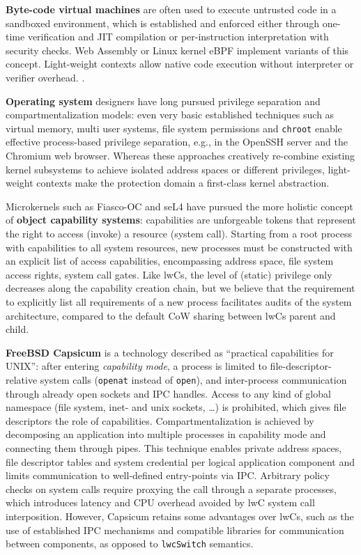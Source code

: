 \documentclass[10pt,twocolumn,a4paper]{article}
\begin{document}
\textbf{Byte-code virtual machines} are often used to execute untrusted code in a sandboxed environment,
which is established and enforced either through one-time verification and JIT compilation or per-instruction interpretation with security checks.
Web Assembly or Linux kernel eBPF implement variants of this concept.
Light-weight contexts allow native code execution without interpreter or verifier overhead.
\cite{haas2017bringingwebassembly, lwnebpf}.

\textbf{Operating system} designers have long pursued privilege separation and compartmentalization models:
even very basic established techniques such as virtual memory, multi user systems, file system permissions and \lstinline{chroot} enable effective process-based privilege separation, e.g., in the OpenSSH server and the Chromium web browser.
Whereas these approaches creatively re-combine existing kernel subsystems to achieve isolated address spaces or different privileges, light-weight contexts make the protection domain a first-class kernel abstraction.
\cite{provos2003preventing, barth2008security}

Microkernels such as Fiasco-OC and seL4 have pursued the more holistic concept of \textbf{object capability systems}:
capabilities are unforgeable tokens that represent the right to access (invoke) a resource (system call).
Starting from a root process with capabilities to all system resources, new processes must be constructed with an explicit list of access capabilities, encompassing address space, file system access rights, system call gates.
Like lwCs, the level of (static) privilege only decreases along the capability creation chain, but we believe that the requirement to explicitly list all requirements of a new process facilitates audits of the system architecture, compared to the default CoW sharing between lwCs parent and child.
\cite{elphinstone2013l3}

\textbf{FreeBSD Capsicum} is a technology described as \enquote{practical capabilities for UNIX}:
after entering \textit{capability mode}, a process is limited to file-descriptor-relative system calls (\lstinline{openat} instead of \lstinline{open}), and inter-process communication through already open sockets and IPC handles.
Access to any kind of global namespace (file system, inet- and unix sockets, \dots) is prohibited, which gives file descriptors the role of capabilities.
Compartmentalization is achieved by decomposing an application into multiple processes in capability mode and connecting them through pipes.
This technique enables private address spaces, file descriptor tables and system credential per logical application component and limits communication to well-defined entry-points via IPC.
Arbitrary policy checks on system calls require proxying the call through a separate processes, which introduces latency and CPU overhead avoided by lwC system call interposition.
However, Capsicum retains some advantages over lwCs, such as the use of established IPC mechanisms and compatible libraries for communication between components, as opposed to \lstinline{lwcSwitch} semantics.
\cite{watson2010capsicum}
\end{document}
